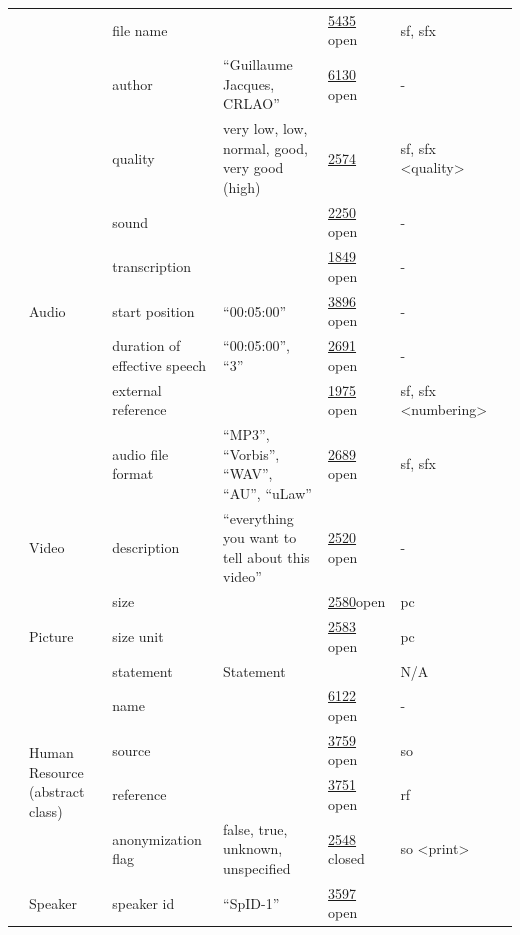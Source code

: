 \documentclass[a4paper,12pt]{article}
\begin{document}
\begin{center}
\begin{longtable}{*7{p{2cm}}}
& & file name & & \href{http://www.isocat.org/datcat/DC-5435}{5435} open & sf, sfx & \\ \cmidrule{3-7}
& & author & ``Guillaume Jacques, CRLAO'' & \href{http://www.isocat.org/datcat/DC-6130}{6130} open & - & \\ \cmidrule{2-7}
& \multirow{7}{2cm}{Audio} & quality & very low, low, normal, good, very good (high) & \href{http://www.isocat.org/datcat/DC-2574}{2574} & sf, sfx \textless quality\textgreater & \\ \cmidrule{3-7}
& & sound & & \href{http://www.isocat.org/datcat/DC-2250}{2250} open & - & \\ \cmidrule{3-7}
& & transcription & & \href{http://www.isocat.org/datcat/DC-1849}{1849} open & - & \\ \cmidrule{3-7}
& & start position & ``00:05:00'' & \href{http://www.isocat.org/datcat/DC-3896}{3896} open & - & \\ \cmidrule{3-7}
& & duration of effective speech & ``00:05:00'', ``3'' & \href{http://www.isocat.org/datcat/DC-2691}{2691} open & - & \\ \cmidrule{3-7}
& & external reference & & \href{http://www.isocat.org/datcat/DC-1975}{1975} open & sf, sfx \textless numbering\textgreater & \\ \cmidrule{3-7}
& & audio file format & ``MP3'', ``Vorbis'', ``WAV'', ``AU'', ``uLaw'' & \href{http://www.isocat.org/datcat/DC-2689}{2689} open & sf, sfx & \\ \cmidrule{2-7}
& \multirow{1}{2cm}{Video} & description & ``everything you want to tell about this video'' & \href{http://www.isocat.org/datcat/DC-2520}{2520} open & - & \\ \cmidrule{2-7}
& \multirow{3}{2cm}{Picture} & size & & \href{http://www.isocat.org/datcat/DC-2580}{2580}open & pc & \\ \cmidrule{3-7}
& & size unit & & \href{http://www.isocat.org/datcat/DC-2583}{2583} open & pc & \\ \cmidrule{3-7}
& & statement & Statement & & N/A & \\ \cmidrule{2-7}
& \multirow{4}{2cm}{Human Resource (abstract class)} & name & & \href{http://www.isocat.org/datcat/DC-6122}{6122} open & - & \\ \cmidrule{3-7}
& & source & & \href{http://www.isocat.org/datcat/DC-3759}{3759} open & so & \\ \cmidrule{3-7}
& & reference & & \href{http://www.isocat.org/datcat/DC-3751}{3751} open & rf & \\ \cmidrule{3-7}
& & a\-no\-ny\-mi\-za\-tion flag & false, true, unknown, unspecified & \href{http://www.isocat.org/datcat/DC-2548}{2548} closed & so \textless print\textgreater & \\ \cmidrule{2-7}
& \multirow{1}{2cm}{Speaker} & speaker id & ``SpID-1'' & \href{http://www.isocat.org/datcat/DC-3597}{3597} open & & \\ \hline\hline
\end{longtable}
\end{center}
\end{document}

